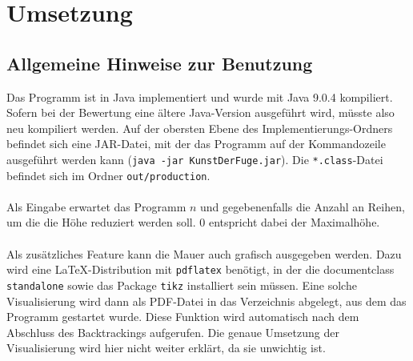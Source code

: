 \documentclass[a4paper, notitlepage, 12pt]{scrartcl}
\begin{document}
\section{Umsetzung}
\subsection{Allgemeine Hinweise zur Benutzung}
Das Programm ist in Java implementiert und wurde mit Java 9.0.4 kompiliert. Sofern bei der Bewertung eine ältere Java-Version ausgeführt wird, müsste also neu kompiliert werden. Auf der obersten Ebene des Implementierungs-Ordners befindet sich eine JAR-Datei, mit der das Programm auf der Kommandozeile ausgeführt werden kann (\texttt{java -jar KunstDerFuge.jar}). Die \texttt{*.class}-Datei befindet sich im Ordner \texttt{out/production}. \\ \\
Als Eingabe erwartet das Programm $n$ und gegebenenfalls die Anzahl an Reihen, um die die Höhe reduziert werden soll. 0 entspricht dabei der Maximalhöhe. \\ \\
Als zusätzliches Feature kann die Mauer auch grafisch ausgegeben werden. Dazu wird eine LaTeX-Distribution mit \texttt{pdflatex} benötigt, in der die documentclass \texttt{standalone} sowie das Package \texttt{tikz} installiert sein müssen. Eine solche Visualisierung wird dann als PDF-Datei in das Verzeichnis abgelegt, aus dem das Programm gestartet wurde. Diese Funktion wird automatisch nach dem Abschluss des Backtrackings aufgerufen. Die genaue Umsetzung der Visualisierung wird hier nicht weiter erklärt, da sie unwichtig ist.
\end{document}
